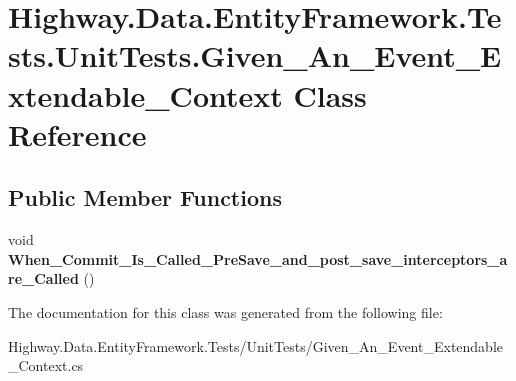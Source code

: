 \hypertarget{class_highway_1_1_data_1_1_entity_framework_1_1_tests_1_1_unit_tests_1_1_given___an___event___extendable___context}{\section{Highway.\-Data.\-Entity\-Framework.\-Tests.\-Unit\-Tests.\-Given\-\_\-\-An\-\_\-\-Event\-\_\-\-Extendable\-\_\-\-Context Class Reference}
\label{class_highway_1_1_data_1_1_entity_framework_1_1_tests_1_1_unit_tests_1_1_given___an___event___extendable___context}
}
\subsection*{Public Member Functions}
\begin{DoxyCompactItemize}
\item 
\hypertarget{class_highway_1_1_data_1_1_entity_framework_1_1_tests_1_1_unit_tests_1_1_given___an___event___extendable___context_a22fb6297a10c5c6934521fe6a05699c7}{void {\bfseries When\-\_\-\-Commit\-\_\-\-Is\-\_\-\-Called\-\_\-\-Pre\-Save\-\_\-and\-\_\-post\-\_\-save\-\_\-interceptors\-\_\-are\-\_\-\-Called} ()}\label{class_highway_1_1_data_1_1_entity_framework_1_1_tests_1_1_unit_tests_1_1_given___an___event___extendable___context_a22fb6297a10c5c6934521fe6a05699c7}

\end{DoxyCompactItemize}


The documentation for this class was generated from the following file\-:\begin{DoxyCompactItemize}
\item 
Highway.\-Data.\-Entity\-Framework.\-Tests/\-Unit\-Tests/Given\-\_\-\-An\-\_\-\-Event\-\_\-\-Extendable\-\_\-\-Context.\-cs\end{DoxyCompactItemize}
